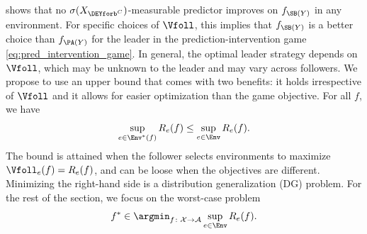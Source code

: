  shows that no $\sigma(X_{\DEYforb^C})$-measurable predictor improves on $f_{\SB(Y)}$ in any environment. For specific choices of $\Vfoll$, this implies that $f_{\SB(Y)}$ is a better choice than $f_{\PA(Y)}$ for the leader in the prediction-intervention game \eqref{eq:pred_intervention_game}. In general, the optimal leader strategy depends on $\Vfoll$, which may be unknown to the leader and may vary across followers. We propose to use an upper bound that comes with two benefits: it holds irrespective of $\Vfoll$ and it allows for easier optimization than the game objective. 
For all $f$, we have
\begin{equation} \label{eq:worst_case_obj}
    \sup_{e \in \Env^*(f)} R_e(f) \leq \sup_{e \in \Env} R_e(f).
\end{equation}
The bound is attained when the follower selects environments to maximize $\Vfoll_e(f) = R_e(f)$, and can be loose
when the objectives are different. Minimizing the right-hand side is a 
distribution generalization (DG) problem. For the rest of the section, we focus on the worst-case problem
\begin{equation} \label{eq:worst-case}
    f^* \in \argmin_{f \colon \mathcal{X} \to \mathcal{A}} \sup_{e \in \Env} R_e(f).
\end{equation}

